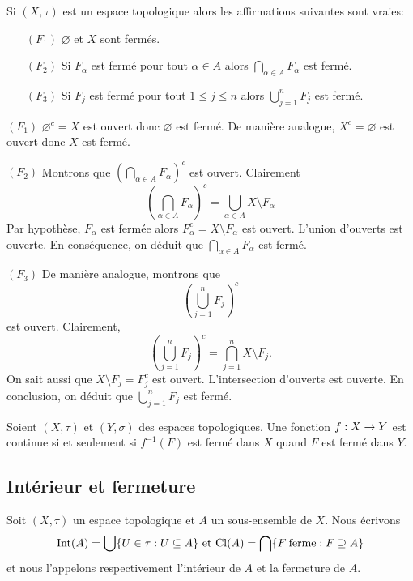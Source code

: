 \documentclass[french]{article}
\begin{document}
\begin{theoreme}
  Si $(X, \tau)$ est un espace topologique alors les affirmations suivantes sont vraies:
  \begin{itemize}
    \item[$(F_1)$] $\varnothing$ et $X$ sont fermés.
    \item[$(F_2)$] Si $F_\alpha$ est fermé pour tout $\alpha \in A$ alors $\bigcap_{\alpha \in A} F_\alpha$ est fermé.
    \item[$(F_3)$] Si $F_j$ est fermé pour tout $1 \leq j \leq n$ alors $\bigcup_{j=1}^n F_j$ est fermé.
  \end{itemize}

  \tcblower
  \begin{preuve}
    $(F_1)$ $\varnothing^{c} = X$ est ouvert donc $\varnothing$ est fermé. De manière analogue, $X^{c} = \varnothing$ est ouvert donc $X$ est fermé.
    \par $(F_2)$ Montrons que $\left(\bigcap_{\alpha \in A} F_\alpha \right)^{c}$ est ouvert. Clairement
    $$\left(\bigcap_{\alpha \in A} F_\alpha \right)^{c} = \bigcup_{\alpha \in A} X \setminus F_\alpha$$
    Par hypothèse, $F_\alpha$ est fermée alors $F_\alpha^{c} = X \setminus F_\alpha$ est ouvert. L'union d'ouverts est ouverte. En conséquence, on déduit que $\bigcap_{\alpha \in A} F_\alpha$ est fermé.
    \par $(F_3)$ De manière analogue, montrons que
    $$\left(\bigcup_{j=1}^n F_j \right)^{c}$$ 
    est ouvert. Clairement,
    $$\left(\bigcup_{j=1}^n F_j \right)^{c} = \bigcap_{j=1}^{n} X \setminus F_j.$$
    On sait aussi que $X \setminus F_j = F_j^{c}$ est ouvert. L'intersection d'ouverts est ouverte. En conclusion, on déduit que $\bigcup_{j=1}^n F_j$ est fermé.
  \end{preuve}
\end{theoreme}

\begin{theoreme}
  Soient $(X, \tau)$ et $(Y, \sigma)$ des espaces topologiques. Une fonction $f: X \rightarrow Y$ est continue si et seulement si $f^{-1}(F)$ est fermé dans $X$ quand $F$ est fermé dans $Y$.
\end{theoreme}

\subsection{Intérieur et fermeture}
\begin{definition}
  Soit $(X, \tau)$ un espace topologique et $A$ un sous-ensemble de $X$. Nous écrivons
  $$\mathrm{Int}(A) = \bigcup \{ U \in \tau : U \subseteq A \} \text{ et } \mathrm{Cl}(A) = \bigcap \{ F \: \mathrm{ ferme} : F \supseteq A \}$$ 
  et nous l'appelons respectivement l'intérieur de $A$ et la fermeture de $A$.
\end{definition}
\end{document}
